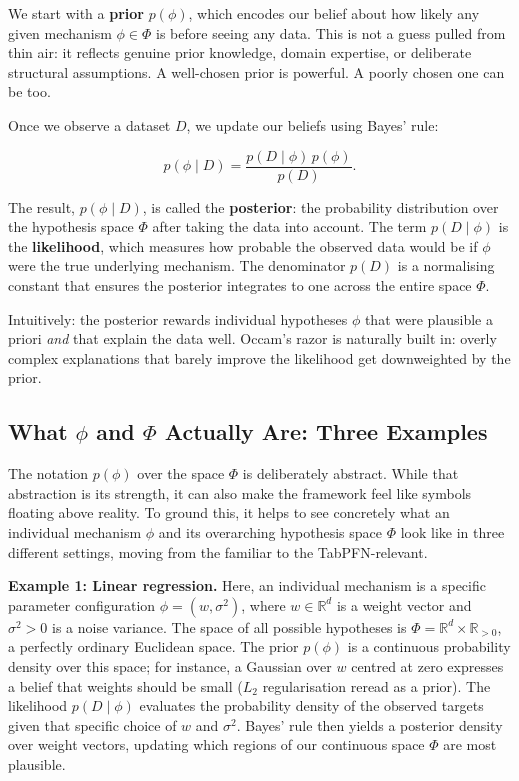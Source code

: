 \documentclass[12pt]{article}
\begin{document}
We start with a \textbf{prior} $p(\phi)$, which encodes our belief about how likely any given mechanism $\phi \in \Phi$ is before seeing any data. This is not a guess pulled from thin air: it reflects genuine prior knowledge, domain expertise, or deliberate structural assumptions. A well-chosen prior is powerful. A poorly chosen one can be too.

Once we observe a dataset $D$, we update our beliefs using Bayes' rule:

\[
p(\phi \mid D) = \frac{p(D \mid \phi)\, p(\phi)}{p(D)}.
\]

The result, $p(\phi \mid D)$, is called the \textbf{posterior}: the probability distribution over the hypothesis space $\Phi$ after taking the data into account. The term $p(D \mid \phi)$ is the \textbf{likelihood}, which measures how probable the observed data would be if $\phi$ were the true underlying mechanism. The denominator $p(D)$ is a normalising constant that ensures the posterior integrates to one across the entire space $\Phi$.

Intuitively: the posterior rewards individual hypotheses $\phi$ that were plausible a priori \emph{and} that explain the data well. Occam's razor is naturally built in: overly complex explanations that barely improve the likelihood get downweighted by the prior.

\subsection{What \texorpdfstring{$\phi$ and $\Phi$}{phi and Phi} Actually Are: Three Examples}

The notation $p(\phi)$ over the space $\Phi$ is deliberately abstract. While that abstraction is its strength, it can also make the framework feel like symbols floating above reality. To ground this, it helps to see concretely what an individual mechanism $\phi$ and its overarching hypothesis space $\Phi$ look like in three different settings, moving from the familiar to the TabPFN-relevant.

\medskip
\noindent\textbf{Example 1: Linear regression.}
Here, an individual mechanism is a specific parameter configuration $\phi = (w, \sigma^2)$, where $w \in \mathbb{R}^d$ is a weight vector and $\sigma^2 > 0$ is a noise variance. The space of all possible hypotheses is $\Phi = \mathbb{R}^d \times \mathbb{R}_{>0}$, a perfectly ordinary Euclidean space. The prior $p(\phi)$ is a continuous probability density over this space; for instance, a Gaussian over $w$ centred at zero expresses a belief that weights should be small ($L_2$ regularisation reread as a prior). The likelihood $p(D \mid \phi)$ evaluates the probability density of the observed targets given that specific choice of $w$ and $\sigma^2$. Bayes' rule then yields a posterior density over weight vectors, updating which regions of our continuous space $\Phi$ are most plausible.
\end{document}
